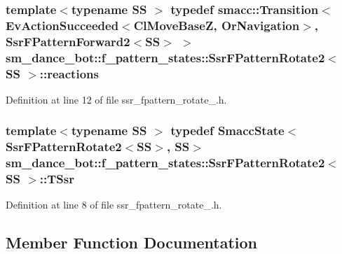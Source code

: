 \subsubsection[{\texorpdfstring{reactions}{reactions}}]{\setlength{\rightskip}{0pt plus 5cm}template$<$typename SS $>$ typedef {\bf smacc\+::\+Transition}$<$Ev\+Action\+Succeeded$<${\bf Cl\+Move\+BaseZ}, {\bf Or\+Navigation}$>$, {\bf Ssr\+F\+Pattern\+Forward2}$<$SS$>$ $>$ {\bf sm\+\_\+dance\+\_\+bot\+::f\+\_\+pattern\+\_\+states\+::\+Ssr\+F\+Pattern\+Rotate2}$<$ SS $>$\+::{\bf reactions}}\hypertarget{structsm__dance__bot_1_1f__pattern__states_1_1SsrFPatternRotate2_a8a716c85615eeedf305680bb7d3519c0}{}\label{structsm__dance__bot_1_1f__pattern__states_1_1SsrFPatternRotate2_a8a716c85615eeedf305680bb7d3519c0}


Definition at line 12 of file ssr\+\_\+fpattern\+\_\+rotate\+\_.\+h.

\subsubsection[{\texorpdfstring{T\+Ssr}{TSsr}}]{\setlength{\rightskip}{0pt plus 5cm}template$<$typename SS $>$ typedef {\bf Smacc\+State}$<${\bf Ssr\+F\+Pattern\+Rotate2}$<$SS$>$, SS$>$ {\bf sm\+\_\+dance\+\_\+bot\+::f\+\_\+pattern\+\_\+states\+::\+Ssr\+F\+Pattern\+Rotate2}$<$ SS $>$\+::{\bf T\+Ssr}}\hypertarget{structsm__dance__bot_1_1f__pattern__states_1_1SsrFPatternRotate2_a88a56b5e255ad57b622ffc4f8c412fa0}{}\label{structsm__dance__bot_1_1f__pattern__states_1_1SsrFPatternRotate2_a88a56b5e255ad57b622ffc4f8c412fa0}


Definition at line 8 of file ssr\+\_\+fpattern\+\_\+rotate\+\_.\+h.



\subsection{Member Function Documentation}
